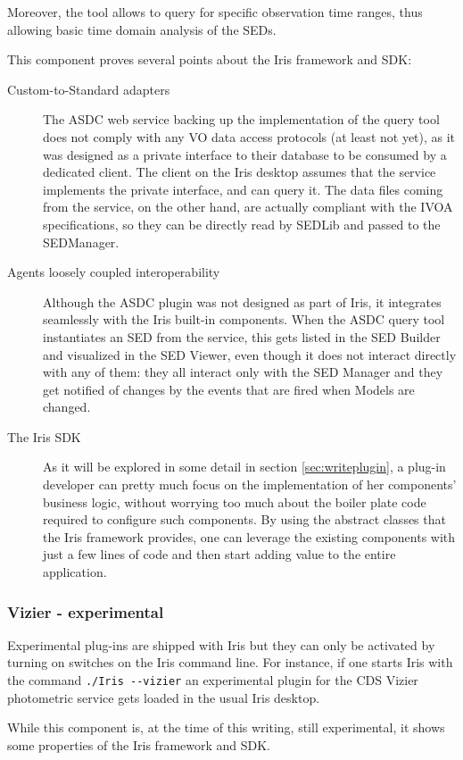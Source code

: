 Moreover, the tool allows to query for specific observation time ranges, thus allowing basic time domain analysis of the SEDs.

This component proves several points about the Iris framework and SDK:
\begin{description}
\item[Custom-to-Standard adapters] The ASDC web service backing up the implementation of the query tool does not comply with any VO data access protocols (at least not yet), as it was designed as a private interface to their database to be consumed by a dedicated client. The client on the Iris desktop assumes that the service implements the private interface, and can query it. The data files coming from the service, on the other hand, are actually compliant with the IVOA specifications, so they can be directly read by SEDLib and passed to the SEDManager.
\item[Agents loosely coupled interoperability] Although the ASDC plugin was not designed as part of Iris, it integrates seamlessly with the Iris built-in components. When the ASDC query tool instantiates an SED from the service, this gets listed in the SED Builder and visualized in the SED Viewer, even though it does not interact directly with any of them: they all interact only with the SED Manager and they get notified of changes by the events that are fired when Models are changed.
\item[The Iris SDK] As it will be explored in some detail in section \ref{sec:writeplugin}, a plug-in developer can pretty much focus on the implementation of her components' business logic, without worrying too much about the boiler plate code required to configure such components. By using the abstract classes that the Iris framework
provides, one can leverage the existing components with just a few lines of code and then start adding value to the entire application.
\end{description}

\subsubsection{Vizier - experimental}
\label{sec:asdc}
Experimental plug-ins are shipped with Iris but they can only be activated by turning on switches on the Iris command line. For instance, if one starts Iris with the command \verb|./Iris --vizier| an experimental plugin for the CDS Vizier photometric service gets loaded in the usual Iris desktop.

While this component is, at the time of this writing, still experimental, it shows some properties of the Iris framework and SDK.

